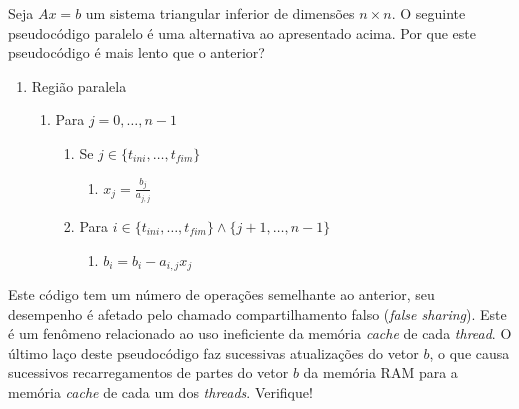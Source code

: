 \begin{exeresol}\label{exeresol:mp_sistria_1drow}
  Seja $Ax = b$ um sistema triangular inferior de dimensões $n\times n$. O seguinte pseudocódigo paralelo é uma alternativa ao apresentado acima. Por que este pseudocódigo é mais lento que o anterior?
  \begin{enumerate}
  \item Região paralela
    \begin{enumerate}
    \item Para $j = 0,\dotsc,n-1$
      \begin{enumerate}
      \item Se $j\in\{t_{ini},\dotsc,t_{fim}\}$
        \begin{enumerate}
        \item $\displaystyle x_j = \frac{b_j}{a_{j,j}}$
        \end{enumerate}
      \item Para $i\in\{t_{ini},\dotsc,t_{fim}\}\land\{j+1,\dotsc,n-1\}$
        \begin{enumerate}
        \item $b_i = b_i - a_{i,j}x_j$
        \end{enumerate}
      \end{enumerate}
    \end{enumerate}
  \end{enumerate}
\end{exeresol}
\begin{resol}
  Este código tem um número de operações semelhante ao anterior, seu desempenho é afetado pelo chamado compartilhamento falso ({\it false sharing}). Este é um fenômeno relacionado ao uso ineficiente da memória {\it cache} de cada {\it thread}. O último laço deste pseudocódigo faz sucessivas atualizações do vetor $b$, o que causa sucessivos recarregamentos de partes do vetor $b$ da memória RAM para a memória {\it cache} de cada um dos {\it threads}. Verifique!
\end{resol}

